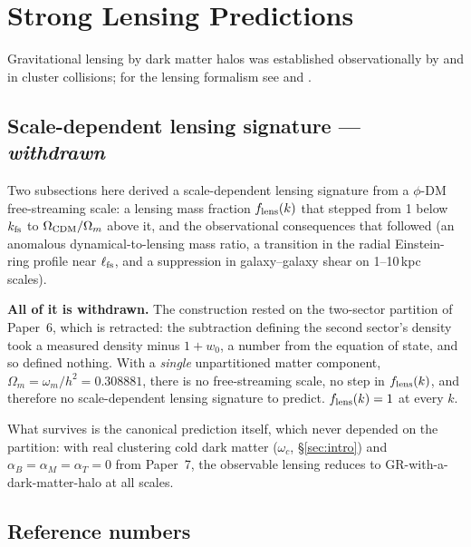 \documentclass[12pt,a4paper]{article}
\begin{document}
\section{Strong Lensing Predictions}
\label{sec:lensing}

Gravitational lensing by dark matter halos was established observationally
by \citet{Bradac2006} and \citet{Clowe2006} in cluster collisions;
for the lensing formalism see \citet{Narayan1996} and \citet{Schneider1992}.

\subsection{Scale-dependent lensing signature --- \emph{withdrawn}}
\label{sec:twosector_signature_withdrawn}

Two subsections here derived a scale-dependent lensing signature from a
$\phi$-DM free-streaming scale: a lensing mass fraction $f_{\rm lens}(k)$ that
stepped from 1 below $k_{\rm fs}$ to $\Omega_{\rm CDM}/\Omega_m$ above it, and
the observational consequences that followed (an anomalous
dynamical-to-lensing mass ratio, a transition in the radial Einstein-ring
profile near $\ell_{\rm fs}$, and a suppression in galaxy--galaxy shear on
1--10\,kpc scales).

\textbf{All of it is withdrawn.} The construction rested on the two-sector
partition of Paper~6, which is retracted: the subtraction defining the second
sector's density took a measured density minus $1+w_0$, a number from the
equation of state, and so defined nothing. With a \emph{single} unpartitioned
matter component, $\Omega_m=\omega_m/h^2=0.308881$, there is no free-streaming
scale, no step in $f_{\rm lens}(k)$, and therefore no scale-dependent lensing
signature to predict. $f_{\rm lens}(k)=1$ at every $k$.

What survives is the canonical prediction itself, which never depended on the
partition: with real clustering cold dark matter ($\omega_c$, \S\ref{sec:intro})
and $\alpha_B=\alpha_M=\alpha_T=0$ from Paper~7, the observable lensing reduces
to GR-with-a-dark-matter-halo at all scales.

\subsection{Reference numbers}
\end{document}
